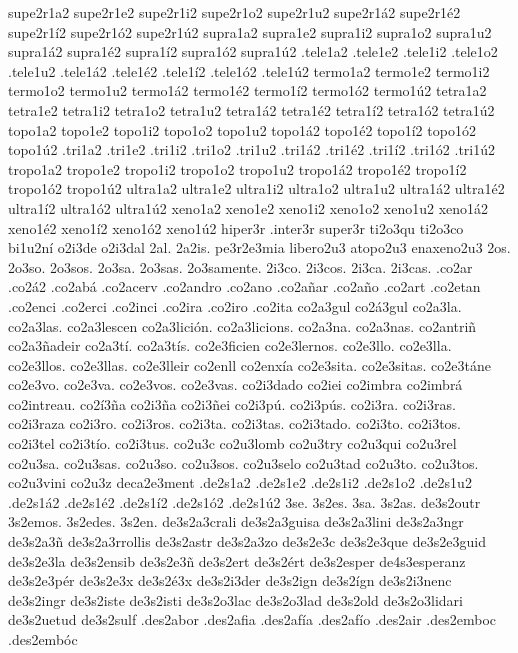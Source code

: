 {supe2r1a2 supe2r1e2 supe2r1i2 supe2r1o2 supe2r1u2 supe2r1á2 supe2r1é2 supe2r1í2 supe2r1ó2 supe2r1ú2
supra1a2 supra1e2 supra1i2 supra1o2 supra1u2 supra1á2 supra1é2 supra1í2 supra1ó2 supra1ú2
.tele1a2 .tele1e2 .tele1i2 .tele1o2 .tele1u2 .tele1á2 .tele1é2 .tele1í2 .tele1ó2 .tele1ú2
termo1a2 termo1e2 termo1i2 termo1o2 termo1u2 termo1á2 termo1é2 termo1í2 termo1ó2 termo1ú2
tetra1a2 tetra1e2 tetra1i2 tetra1o2 tetra1u2 tetra1á2 tetra1é2 tetra1í2 tetra1ó2 tetra1ú2
topo1a2 topo1e2 topo1i2 topo1o2 topo1u2 topo1á2 topo1é2 topo1í2 topo1ó2 topo1ú2
.tri1a2 .tri1e2 .tri1i2 .tri1o2 .tri1u2 .tri1á2 .tri1é2 .tri1í2 .tri1ó2 .tri1ú2
tropo1a2 tropo1e2 tropo1i2 tropo1o2 tropo1u2 tropo1á2 tropo1é2 tropo1í2 tropo1ó2 tropo1ú2
ultra1a2 ultra1e2 ultra1i2 ultra1o2 ultra1u2 ultra1á2 ultra1é2 ultra1í2 ultra1ó2 ultra1ú2
xeno1a2 xeno1e2 xeno1i2 xeno1o2 xeno1u2 xeno1á2 xeno1é2 xeno1í2 xeno1ó2 xeno1ú2
%
hiper3r .inter3r super3r
%
ti2o3qu ti2o3co bi1u2ní o2i3de o2i3dal 2al. 2a2is. pe3r2e3mia
%
libero2u3
atopo2u3
enaxeno2u3
%
2os. 2o3so. 2o3sos. 2o3sa. 2o3sas. 2o3samente.
2i3co. 2i3cos. 2i3ca. 2i3cas.
%
%
.co2ar
.co2á2
.co2abá
.co2acerv
.co2andro
.co2ano
.co2añar
.co2año
.co2art
.co2etan
.co2enci
.co2erci
.co2inci
.co2ira
.co2iro
.co2ita
%
co2a3gul
co2á3gul
co2a3la.
co2a3las.
co2a3lescen
co2a3lición.
co2a3licions.
co2a3na.
co2a3nas.
co2antriñ
co2a3ñadeir
co2a3tí.
co2a3tís.
co2e3ficien
co2e3lernos.
co2e3llo.
co2e3lla.
co2e3llos.
co2e3llas.
co2e3lleir
co2enll
co2enxía
co2e3sita.
co2e3sitas.
co2e3táne
co2e3vo.
co2e3va.
co2e3vos.
co2e3vas.
co2i3dado
co2iei
co2imbra
co2imbrá
co2intreau.
co2í3ña
co2i3ña
co2i3ñei
co2i3pú.
co2i3pús.
co2i3ra.
co2i3ras.
co2i3raza
co2i3ro.
co2i3ros.
co2i3ta.
co2i3tas.
co2i3tado.
co2i3to.
co2i3tos.
co2i3tel
co2i3tío.
co2i3tus.
co2u3c
co2u3lomb
co2u3try
co2u3qui
co2u3rel
co2u3sa.
co2u3sas.
co2u3so.
co2u3sos.
co2u3selo
co2u3tad
co2u3to.
co2u3tos.
co2u3vini
co2u3z
deca2e3ment
.de2s1a2 .de2s1e2 .de2s1i2 .de2s1o2 .de2s1u2 .de2s1á2 .de2s1é2 .de2s1í2 .de2s1ó2 .de2s1ú2
3se. 3s2es. 3sa. 3s2as. de3s2outr 3s2emos. 3s2edes. 3s2en.
%
de3s2a3crali
de3s2a3guisa
de3s2a3lini
de3s2a3ngr
de3s2a3ñ
de3s2a3rrollis
de3s2astr
de3s2a3zo
de3s2e3c
de3s2e3que
de3s2e3guid
de3s2e3la
de3s2ensib
de3s2e3ñ
de3s2ert
de3s2ért
de3s2esper de4s3esperanz
de3s2e3pér
de3s2e3x
de3s2é3x
de3s2i3der
de3s2ign
de3s2ígn
de3s2i3nenc
de3s2ingr
de3s2iste
de3s2isti
de3s2o3lac
de3s2o3lad
de3s2old
de3s2o3lidari
de3s2uetud
de3s2sulf
%
.des2abor
.des2afia
.des2afía
.des2afío
.des2air
.des2emboc
.des2embóc
}
